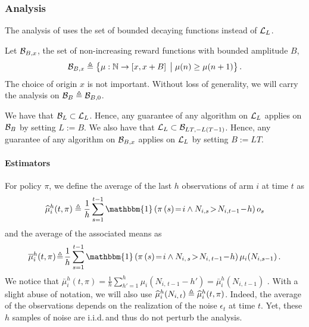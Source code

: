 \subsubsection*{Analysis}

The analysis of \citet{levine2017rotting} uses the set of bounded decaying functions instead of $\mathcal{L}_L$. 

\begin{definition}\label{def:rew-bounded} 
Let $\mathcal{B}_{B,x}$, the set of non-increasing reward functions with bounded amplitude $B$,
\[ 
\mathcal{B}_{B,x} \triangleq \left\{ \mu: {\mathbb N} \rightarrow \left[x , x +B\right] \;\big{|}\; \mu(n) \geq \mu(n+1)  \right\}.
\]
The choice of origin $x$ is not important. Without loss of generality, we will carry the analysis on $\mathcal{B}_{B} \triangleq \mathcal{B}_{B,0}$. 
\end{definition}
\begin{remark}
We have that $\mathcal{B}_L \subset \mathcal{L}_L$. Hence, any guarantee of any algorithm on $\mathcal{L}_L$ applies on $\mathcal{B}_{B}$ by setting $L := B$. We also have that $\mathcal{L}_L \subset \mathcal{B}_{LT, -L\left(T-1\right)}$. Hence, any guarantee of any algorithm on $\mathcal{B}_{B,x}$ applies on $\mathcal{L}_L$ by setting $B := LT$.
\end{remark}

\paragraph{Estimators}  
For policy $\pi$, we define the average of the last $h$ observations of arm $i$ at time $t$ as
\begin{equation}
\label{eq:def-hmu}
\widehat{\mu}_i^h(t,\pi) \triangleq \frac{1}{h}\sum_{s=1}^{t-1} \mathbbm{1}\pa{\pi\pa{s}\! =\! i \land N_{i,s}\!>\! N_{i,t-1}\! -\! h } o_{s}
\end{equation}
and the average of the associated means as
\begin{equation}
\label{eq:def-bmu}
\bar{\mu}_i^h(t,\pi) \!\triangleq\! \frac{1}{h}\sum_{s=1}^{t-1} \mathbbm{1}\pa{\pi\pa{s}\! =\! i \land N_{i,\,s}\!>\! N_{i,\,t-1}\! -\! h } \mu_{i}(N_{i,s-1})\,.
\end{equation}
%
We notice that $\bar{\mu}_i^h(t,\pi) = \frac{1}{h}\sum_{h'=1}^{h} \mu_i(N_{i,\,t-1}-h') = \bar{\mu}_i^h(N_{i,\,t-1})$ . With a slight abuse of notation, we will also use $\widehat{\mu}_i^h(N_{i,\,t}) \triangleq \widehat{\mu}_i^h(t,\pi)$. Indeed, the average of the observations depends on the realization of the noise $\epsilon_t$ at time $t$. Yet, these $h$ samples of noise are i.i.d.\,and thus do not perturb the analysis. 

